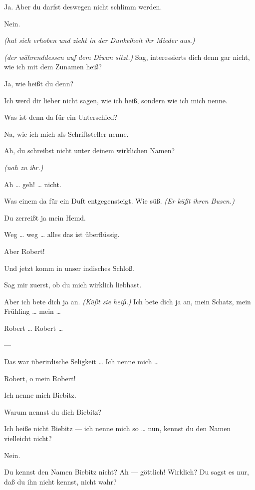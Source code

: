 \documentclass[
	final,
	a4paper,
	ngerman,
	mpinclude = true, %
	twoside = true,
	open = right,
	cleardoublepage = plain,
	DIV = 13,
	BCOR = 1cm,
	titlepage = firstiscover,
	]{scrbook}
\newcommand{\direction}[1]{\textit{(#1)}}
\newcommand{\hiat}{---}
\newcommand{\thecharacter}[1]{\textup{\textsc{#1}}}
\newcommand{\thesuesse}{\thecharacter{Süßes Mädel}}
\newcommand{\thedichter}{\thecharacter{Dichter}}
\newcommand{\character}[1]{\item[#1:]}
\newcommand{\suesse}{\character{\thesuesse}}
\newcommand{\dichter}{\character{\thedichter}}
\begin{document}
\begin{play}
	\suesse
	Ja. Aber du darfst deswegen nicht schlimm werden.

	\dichter
	Nein.

	\suesse
	\direction{hat sich erhoben und zieht in der Dunkelheit ihr Mieder aus.}

	\dichter
	\direction{der währenddessen auf dem Diwan sitzt.} Sag, interessierts dich denn gar nicht, wie ich mit dem Zunamen heiß?

	\suesse
	Ja, wie heißt du denn?

	\dichter
	Ich werd dir lieber nicht sagen, wie ich heiß, sondern wie ich mich nenne.

	\suesse
	Was ist denn da für ein Unterschied?

	\dichter
	Na, wie ich mich als Schriftsteller nenne.

	\suesse
	Ah, du schreibst nicht unter deinem wirklichen Namen?

	\dichter
	\direction{nah zu ihr.}

	\suesse
	Ah \ldots{} geh! \ldots{} nicht.

	\dichter
	Was einem da für ein Duft entgegensteigt. Wie süß. \direction{Er küßt ihren Busen.}

	\suesse
	Du zerreißt ja mein Hemd.

	\dichter
	Weg \ldots{} weg \ldots{} alles das ist überflüssig.

	\suesse
	Aber Robert!

	\dichter
	Und jetzt komm in unser indisches Schloß.

	\suesse
	Sag mir zuerst, ob du mich wirklich liebhast.

	\dichter
	Aber ich bete dich ja an. \direction{Küßt sie heiß.} Ich bete dich ja an, mein Schatz, mein Frühling \ldots{} mein \ldots{}

	\suesse
	Robert \ldots{} Robert \ldots{}

	\hiat

	\dichter
	Das war überirdische Seligkeit \ldots{} Ich nenne mich \ldots{}

	\suesse
	Robert, o mein Robert!

	\dichter
	Ich nenne mich Biebitz.

	\suesse
	Warum nennst du dich Biebitz?

	\dichter
	Ich heiße nicht Biebitz --- ich nenne mich so \ldots{} nun, kennst du den Namen vielleicht nicht?

	\suesse
	Nein.

	\dichter
	Du kennst den Namen Biebitz nicht? Ah --- göttlich! Wirklich? Du sagst es nur, daß du ihn nicht kennst, nicht wahr?


\end{play}
\end{document}

